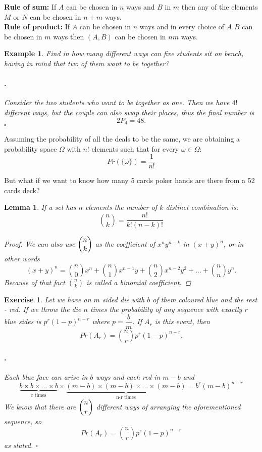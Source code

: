 \documentclass[12pt, a4paper,leqno]{report}
\newenvironment{solution}{\paragraph{\normalfont{\textit{Solution}}.}}{\hfill\null$\square$}
\newtheorem{lemma}{Lemma}[chapter]
\theoremstyle{normal}
\newtheorem{exercise}{Exercise}[chapter]
\theoremstyle{normal}
\newtheorem{example}{Example}[chapter]
\begin{document}
	\noindent\textbf{Rule of sum:} If $A$ can be chosen in $n$ ways and $B$ in $m$ then any of the elements $M$ or $N$ can be chosen in $n+m$ ways.\\
	
	\noindent\textbf{Rule of product:} If $A$ can be chosen in $n$ ways and in every choice of $A$ $B$ can be chosen in $m$ ways then $(A, B)$ can be chosen in $nm$ ways.\\
	
	\begin{example}
		Find in how many different ways can five students sit on bench, having in mind that two of them want to be together?
		\begin{solution}
			Consider the two students who want to be together as one. Then we have $4!$ different ways, but the couple can also swap their places, thus the final number is
			\[ 2P_4 = 48. \]  
		\end{solution}
	\end{example}
		
	Assuming the probability of all the deals to be the same, we are obtaining a probability space $\Omega$ with $n!$ elements such that for every $\omega\in\Omega$:
	\[ Pr(\lbrace\omega\rbrace) = \frac{1}{n!} \]
	
	But what if we want to know how many 5 cards poker hands are there from a 52 cards deck?
	
	\begin{lemma}
		If a set has $n$ elements the number of $k$ distinct combination is:
		\[ \binom{n}{k} = \frac{n!}{k!(n-k)!} \]
		\begin{proof}
			We can also use $\dbinom{n}{k}$ as the coefficient of $x^ny^{n-k}$ in $(x+y)^n$, or in other words
			\[ (x+y)^n = \binom{n}{0}x^n + \binom{n}{1}x^{n-1}y + \binom{n}{2}x^{n-2}y^2 +\dots + \binom{n}{n}y^n. \]
			Because of that fact $\binom{n}{k}$ is called a \textit{binomial coefficient}.
		\end{proof}
	\end{lemma}
	
	\begin{exercise}
		 Let we have an $m$ sided die with $b$ of them coloured blue and the rest - red. If we throw the die $n$ times the probability of any sequence with exactly $r$ blue sides is $p^r(1-p)^{n-r}$ where $p = \dfrac{b}{m}$.
		 If $A_r$ is this event, then
		 \[ Pr(A_r) = \binom{n}{r}p^r(1-p)^{n-r}. \]
		 \begin{solution}
		 	Each blue face can arise in $b$ ways and each red in $m-b$ and
		 	\[ \underbrace{b\times b\times\dots\times b}_{\mbox{r times}}\times \underbrace{(m-b)\times (m-b)\times\dots\times (m-b)}_{\mbox{n-r times}} = b^r(m-b)^{n-r} \]
		 	We know that there are $\dbinom{n}{r}$ different ways of arranging the aforementioned sequence, so
		 	\[ Pr(A_r) = \binom{n}{r}p^r(1-p)^{n-r} \]
		 	as stated.
		 \end{solution}
	\end{exercise}
	
\end{document}
